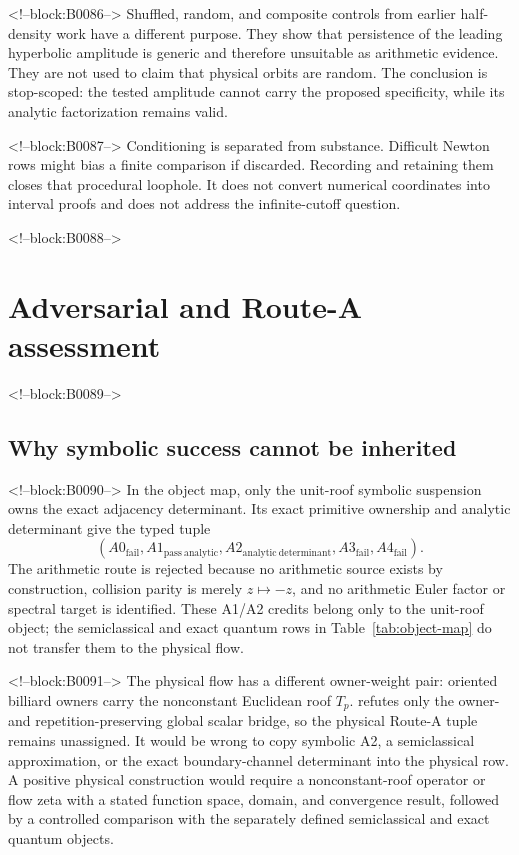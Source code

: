 \documentclass[11pt,a4paper]{article}
\theoremstyle{definition}
\theoremstyle{remark}
\begin{document}
<!--block:B0086-->
Shuffled, random, and composite controls from earlier half-density work have a different purpose. They show that persistence of the leading hyperbolic amplitude is generic and therefore unsuitable as arithmetic evidence. They are not used to claim that physical orbits are random. The conclusion is stop-scoped: the tested amplitude cannot carry the proposed specificity, while its analytic factorization remains valid.

<!--block:B0087-->
Conditioning is separated from substance. Difficult Newton rows might bias a finite comparison if discarded. Recording and retaining them closes that procedural loophole. It does not convert numerical coordinates into interval proofs and does not address the infinite-cutoff question.

<!--block:B0088-->
\section{Adversarial and Route-A assessment}

<!--block:B0089-->
\subsection{Why symbolic success cannot be inherited}

<!--block:B0090-->
In the object map, only the unit-roof symbolic suspension owns the exact adjacency determinant. Its exact primitive ownership and analytic determinant give the typed tuple
\[
 (A0_{\mathrm{fail}},A1_{\mathrm{pass\ analytic}},
 A2_{\mathrm{analytic\ determinant}},A3_{\mathrm{fail}},A4_{\mathrm{fail}}).
\]
The arithmetic route is rejected because no arithmetic source exists by construction, collision parity is merely \(z\mapsto-z\), and no arithmetic Euler factor or spectral target is identified. These A1/A2 credits belong only to the unit-roof object; the semiclassical and exact quantum rows in Table~\ref{tab:object-map} do not transfer them to the physical flow.

<!--block:B0091-->
The physical flow has a different owner-weight pair: oriented billiard owners carry the nonconstant Euclidean roof \(T_p\).  refutes only the owner- and repetition-preserving global scalar bridge, so the physical Route-A tuple remains unassigned. It would be wrong to copy symbolic A2, a semiclassical approximation, or the exact boundary-channel determinant into the physical row. A positive physical construction would require a nonconstant-roof operator or flow zeta with a stated function space, domain, and convergence result, followed by a controlled comparison with the separately defined semiclassical and exact quantum objects.
\end{document}
